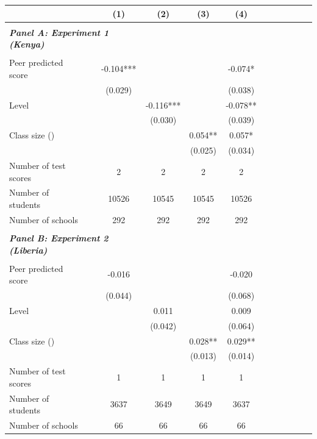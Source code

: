 \begin{center} 
\caption{\small Effect on within-class dispersion of test scores} 
\label{tab:descriptives} 
\begin{small}
\begin{threeparttable}
\begin{tabular} {@{} l l c c c c c c c c c c  @{}} \toprule \toprule
& &(1)&(2)&(3)&(4) \\ \midrule 
\\
\multicolumn{3}{l}{\textbf{\textit{Panel A: Experiment 1 (Kenya)}}} \\
\\
Peer predicted score &  & -0.104*** &  &  & -0.074* \\
                 &  & (0.029) &  &  & (0.038) \\
Level &  &  & -0.116*** &  & -0.078** \\
                 &  &  & (0.030) &  & (0.039) \\
Class size (\times 10) &  &  &  & 0.054** & 0.057* \\
                 &  &  &  & (0.025) & (0.034) \\
\midrule
Number of test scores &  & 2 & 2 & 2 & 2 \\
Number of students &  & 10526 & 10545 & 10545 & 10526 \\
Number of schools &  & 292 & 292 & 292 & 292 \\
 \midrule
\\
\multicolumn{3}{l}{\textbf{\textit{Panel B: Experiment 2 (Liberia)}}} \\
\\
Peer predicted score &  & -0.016 &  &  & -0.020 \\
                 &  & (0.044) &  &  & (0.068) \\
Level &  &  & 0.011 &  & 0.009 \\
                 &  &  & (0.042) &  & (0.064) \\
Class size (\times 10) &  &  &  & 0.028** & 0.029** \\
                 &  &  &  & (0.013) & (0.014) \\
\midrule
Number of test scores &  & 1 & 1 & 1 & 1 \\
Number of students &  & 3637 & 3649 & 3649 & 3637 \\
Number of schools &  & 66 & 66 & 66 & 66 \\
\bottomrule
\end{tabular}
\begin{tablenotes}

\end{tablenotes}
\end{threeparttable}
\end{small}
\end{center}
